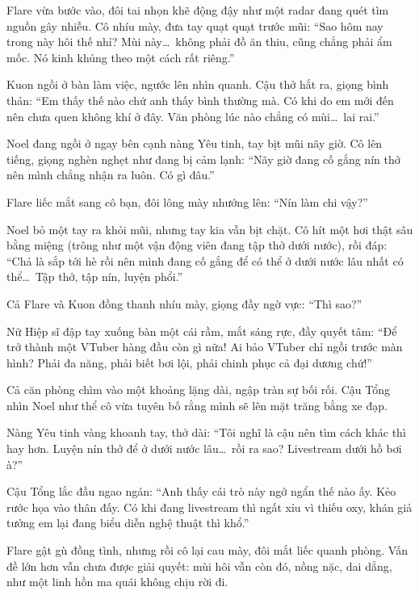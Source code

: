 \documentclass[../main.tex]{subfiles}
\begin{document}
\chrint

Flare vừa bước vào, đôi tai nhọn khẽ động đậy như một radar đang quét tìm nguồn gây nhiễu. Cô nhíu mày, đưa tay quạt quạt trước mũi: ``Sao hôm nay trong này hôi thế nhỉ? Mùi này\dots\ không phải đồ ăn thiu, cũng chẳng phải ẩm mốc. Nó kinh khủng theo một cách rất riêng.''

Kuon ngồi ở bàn làm việc, ngước lên nhìn quanh. Cậu thở hắt ra, giọng bình thản: ``Em thấy thế nào chứ anh thấy bình thường mà. Có khi do em mới đến nên chưa quen không khí ở đây. Văn phòng lúc nào chẳng có mùi\dots\ lai rai.''

Noel đang ngồi ở ngay bên cạnh nàng Yêu tinh, tay bịt mũi nãy giờ. Cô lên tiếng, giọng nghèn nghẹt như đang bị cảm lạnh: ``Nãy giờ đang cố gắng nín thở nên mình chẳng nhận ra luôn. Có gì đâu.''


Flare liếc mắt sang cô bạn, đôi lông mày nhướng lên: ``Nín làm chi vậy?''

Noel bỏ một tay ra khỏi mũi, nhưng tay kia vẫn bịt chặt. Cô hít một hơi thật sâu bằng miệng (trông như một vận động viên đang tập thở dưới nước), rồi đáp: ``Chả là sắp tới hè rồi nên mình đang cố gắng để có thể ở dưới nước lâu nhất có thể\dots\ Tập thở, tập nín, luyện phổi.''

Cả Flare và Kuon đồng thanh nhíu mày, giọng đầy ngờ vực: ``Thì sao?''

Nữ Hiệp sĩ đập tay xuống bàn một cái rầm, mắt sáng rực, đầy quyết tâm: ``Để trở thành một VTuber hàng đầu còn gì nữa! Ai bảo VTuber chỉ ngồi trước màn hình? Phải đa năng, phải biết bơi lội, phải chinh phục cả đại dương chứ!''

Cả căn phòng chìm vào một khoảng lặng dài, ngập tràn sự bối rối. Cậu Tổng nhìn Noel như thể cô vừa tuyên bố rằng mình sẽ lên mặt trăng bằng xe đạp.

Nàng Yêu tinh vàng khoanh tay, thở dài: ``Tôi nghĩ là cậu nên tìm cách khác thì hay hơn. Luyện nín thở để ở dưới nước lâu\dots\ rồi ra sao? Livestream dưới hồ bơi à?''

Cậu Tổng lắc đầu ngao ngán: ``Anh thấy cái trò này ngớ ngẩn thế nào ấy. Kẻo rước họa vào thân đấy. Có khi đang livestream thì ngất xỉu vì thiếu oxy, khán giả tưởng em lại đang biểu diễn nghệ thuật thì khổ.''

Flare gật gù đồng tình, nhưng rồi cô lại cau mày, đôi mắt liếc quanh phòng. Vấn đề lớn hơn vẫn chưa được giải quyết: mùi hôi vẫn còn đó, nồng nặc, dai dẳng, như một linh hồn ma quái không chịu rời đi.
\end{document}
